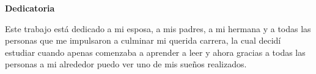 \documentclass[../principal.tex]{subfiles}
\begin{document}
  \thispagestyle{empty}
  \begin{center}
    \textbf{Dedicatoria}
  \end{center}
  
  Este trabajo está dedicado a mi esposa, a mis padres, a mi hermana y a todas las personas que me impulsaron a culminar mi querida carrera, la cual decidí estudiar cuando apenas comenzaba a aprender a leer y ahora gracias a todas las personas a mi alrededor puedo ver uno de mis sueños realizados.

  \newpage
\end{document}
